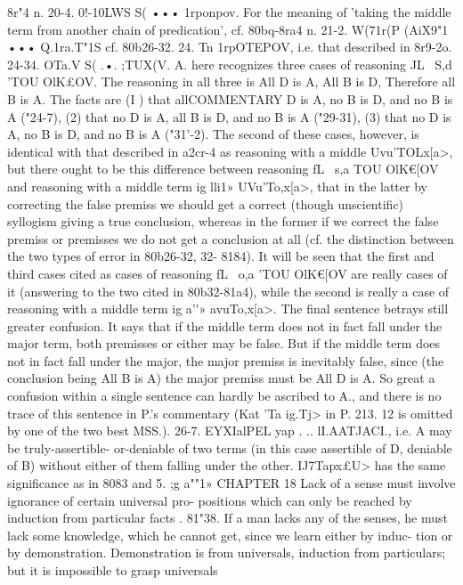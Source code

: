 {{{{{{{{{{{{{8r"4 n.
20-4. 0!-10LWS S( ••• 1rponpov. For the meaning of 'taking the
middle term from another chain of predication', cf. 80bq-8ra4 n.
21-2. W(71r(P (AiX9"1 ••• Q.1ra.T"1S cf. 80b26-32.
24. Tn 1rpOTEPOV, i.e. that described in 8r9-2o.
24-34. OTa.V S( .•. ;TUX(V. A. here recognizes three cases of
reasoning JL~ S,d 'TOU OlK£{OV. The reasoning in all three is All D
is A, All B is D, Therefore all B is A. The facts are (I ) that allCOMMENTARY
D is A, no B is D, and no B is A ("24-7), (2) that no D is A, all
B is D, and no B is A ("29-31), (3) that no D is A, no B is D,
and no B is A ("31'-2). The second of these cases, however, is
identical with that described in a2cr-4 as reasoning with a middle
Uvu'TOLx[a>, but there ought to be this difference between
reasoning fL~ s,a TOU OlK€[OV and reasoning with a middle term
ig lli1» UVu'To,x[a>, that in the latter by correcting the false
premiss we should get a correct (though unscientific) syllogism
giving a true conclusion, whereas in the former if we correct the
false premiss or premisses we do not get a conclusion at all (cf.
the distinction between the two types of error in 80b26-32, 32-
8184). It will be seen that the first and third cases cited as cases
of reasoning fL~ o,a 'TOU OlK€[OV are really cases of it (answering
to the two cited in 80b32-81a4), while the second is really a case
of reasoning with a middle term ig a'\'\1» avuTo,x[a>.
The final sentence betrays still greater confusion. It says that
if the middle term does not in fact fall under the major term,
both premisses or either may be false. But if the middle term does
not in fact fall under the major, the major premiss is inevitably
false, since (the conclusion being All B is A) the major premiss
must be All D is A. So great a confusion within a single sentence
can hardly be ascribed to A., and there is no trace of this sentence
in P.'s commentary (Kat 'Ta ig.Tj> in P. 213. 12 is omitted by one
of the two best MSS.).
26-7. EYXIalPEL yap . .. lI.AATJACI., i.e. A may be truly-assertible-
or-deniable of two terms (in this case assertible of D, deniable
of B) without either of them falling under the other. IJ7Tapx£U>
has the same significance as in 8083 and 5.
;g a""1»
CHAPTER 18
Lack of a sense must involve ignorance of certain universal pro-
positions which can only be reached by induction from particular
facts
.
81"38. If a man lacks any of the senses, he must lack some
knowledge, which he cannot get, since we learn either by induc-
tion or by demonstration. Demonstration is from universals,
induction from particulars; but it is impossible to grasp universals
}}}}}}}}}}}}}}
